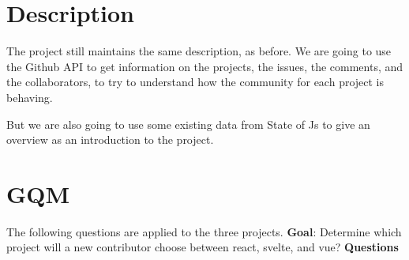 \section{Description}
The project still maintains the same description, as before. We are going to use the Github API to get information on the projects, the issues, the comments, and the collaborators, to try to understand how the community for each project is behaving.\newline\newline

\noindent
But we are also going to use some existing data from State of Js to give an overview as an introduction to the project.

\pagebreak

\section{GQM}
The following questions are applied to the three projects.\newline\newline
\noindent
\textbf{Goal}: Determine which project will a new contributor choose between react, svelte, and vue?\newline\newline
\textbf{Questions}
